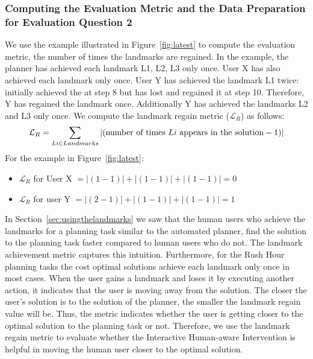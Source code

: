 \subsubsection{Computing the Evaluation Metric and the Data Preparation for Evaluation Question 2}
We use the example illustrated in Figure~\ref{fig:latest} to compute the evaluation metric, the number of times the landmarks are regained.
In the example, the planner has achieved each landmark L1, L2, L3 only once.
User X has also achieved each landmark only once.
User Y has achieved the landmark L1 twice: initially achieved the at step 8 but has lost and regained it at step 10.
Therefore, Y has regained the landmark once.
Additionally Y has achieved the landmarks L2 and L3 only once.
We compute the landmark regain metric ($\mathcal{L}_R$) as follows:
\begin{equation}
\mathcal{L}_R = \sum_{Li \in Landmarks} \left | (\textup{number of times } Li \textup{ appears in the solution} - 1) \right |
\end{equation}
For the example in Figure~\ref{fig:latest}:
\begin{itemize}
\item $\mathcal{L}_R$ for User X $= |(1-1)| + |(1-1)| + |(1-1)| = 0$
\item $\mathcal{L}_R$ for user Y $=|(2-1)| + |(1-1)| + |(1-1)| = 1$
\end{itemize}
In Section~\ref{sec:usingthelandmarks} we saw that the human users who achieve the landmarks for a planning task similar to the automated planner, find the solution to the planning task faster compared to human users who do not.
The landmark achievement metric captures this intuition.
Furthermore, for the Rush Hour planning tasks the cost optimal solutions achieve each landmark only once in most cases.
When the user gains a landmark and loses it by executing another action, it indicates that the user is moving away from the solution.
The closer the user's solution is to the solution of the planner, the smaller the landmark regain value will be.
Thus, the metric indicates whether the user is getting closer to the optimal solution to the planning task or not.
Therefore, we use the landmark regain metric to evaluate whether the Interactive Human-aware Intervention is helpful in moving the human user closer to the optimal solution.


